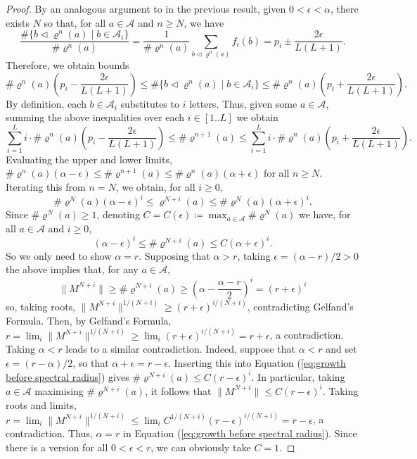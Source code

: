 \documentclass[11pt]{amsart}
\numberwithin{equation}{section}
\theoremstyle{plain}
\theoremstyle{definition}
\newcommand{\mc}{\mathcal}
\newcommand{\A}{\mc A}
\newcommand{\sub}{\varrho}
\begin{document}
\begin{proof}
By an analogous argument to in the previous result, given \(0 < \epsilon < \alpha\), there exists \(N\) so that, for all \(a \in \A\) and \(n \geq N\), we have
\begin{equation} \label{eq:Ai frequency estimates}
\frac{\# \{b \triangleleft \sub^n(a) \mid b \in \A_i\}}{\# \sub^n(a)} = \frac{1}{\# \sub^n(a)} \sum_{b \triangleleft \sub^n(a)} f_i(b) = p_i \pm \frac{2\epsilon}{L(L+1)} .
\end{equation}
Therefore, we obtain bounds
\[
\# \sub^n(a) \left(p_i - \frac{2\epsilon}{L(L+1)} \right) \leq \# \{b \triangleleft \sub^n(a) \mid b \in \A_i\} \leq \# \sub^n(a) \left(p_i + \frac{2\epsilon}{L(L+1)} \right) .
\]
By definition, each \(b \in \A_i\) substitutes to \(i\) letters. Thus, given some \(a \in \A\), summing the above inequalities over each \(i \in [1..L]\) we obtain
\[
\sum_{i=1}^L i \cdot \#\sub^n(a)\left( p_i - \frac{2\epsilon}{L(L+1)} \right) \leq \# \sub^{n+1}(a) \leq \sum_{i=1}^L i \cdot \# \sub^n(a) \left( p_i + \frac{2\epsilon}{L(L+1)} \right) .
\]
Evaluating the upper and lower limits, \(\# \sub^n(a)(\alpha - \epsilon) \leq \# \sub^{n+1}(a) \leq \# \sub^n(a)(\alpha + \epsilon)\) for all \(n \geq N\). Iterating this from \(n = N\), we obtain, for all \(i \geq 0\),
\[
\# \sub^N(a) (\alpha-\epsilon)^i \leq \sub^{N + i}(a) \leq \# \sub^N(a) (\alpha + \epsilon)^i .
\]
Since \(\# \sub^N(a) \geq 1\), denoting \(C = C(\epsilon) \coloneqq \max_{a \in \A} \# \sub^N(a)\) we have, for all \(a \in \A\) and \(i \geq 0\),
\begin{equation}\label{eq:growth before spectral radius}
(\alpha-\epsilon)^i \leq \# \sub^{N + i}(a) \leq C(\alpha + \epsilon)^i .
\end{equation}
So we only need to show \(\alpha = r\). Supposing that \(\alpha > r\), taking \(\epsilon = (\alpha-r)/2 > 0\) the above implies that, for any \(a \in \A\),
\[
\|M^{N+i}\| \geq \# \sub^{N+i}(a) \geq \left(\alpha - \frac{\alpha-r}{2} \right)^i = (r+\epsilon)^i 
\]
so, taking roots, \( \|M^{N+i}\|^{1/(N+i)} \geq (r+\epsilon)^{i/(N+i)}\), contradicting Gelfand's Formula. Then, by Gelfand's Formula, \(r = \lim_i \|M^{N+i}\|^{1/(N+i)} \geq \lim_i (r+\epsilon)^{i/(N+i)} = r+\epsilon\), a contradiction. Taking \(\alpha < r\) leads to a similar contradiction. Indeed, suppose that \(\alpha < r\) and set \(\epsilon = (r-\alpha)/2\), so that \(\alpha + \epsilon = r - \epsilon\). Inserting this into Equation (\ref{eq:growth before spectral radius}) gives \(\# \sub^{N + i}(a) \leq C(r - \epsilon)^i\). In particular, taking \(a \in \A\) maximising \(\# \sub^{N+i}(a)\), it follows that \(\|M^{N+i}\| \leq C(r - \epsilon)^i\). Taking roots and limits, \(r = \lim_i \|M^{N+i}\|^{1/(N+i)} \leq \lim_i C^{1/(N+i)} (r-\epsilon)^{i/(N+i)} = r-\epsilon\), a contradiction. Thus, \(\alpha = r\) in Equation (\ref{eq:growth before spectral radius}). Since there is a version for all \(0 < \epsilon < r\), we can obviously take \(C = 1\).
\end{proof}
\end{document}
